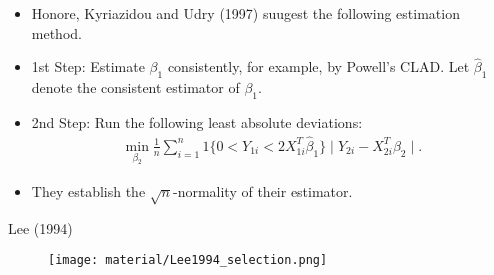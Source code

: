 \documentclass[xcolor=svgnames,dvipdfmx,cjk]{beamer}
\theoremstyle{example}
\begin{document}
\begin{frame}
      \begin{itemize}
            \item Honore, Kyriazidou and Udry (1997) suugest the following estimation method.
            \item \alert{1st Step}: Estimate $\beta_1$ consistently, 
                  for example, by Powell's CLAD.
                  Let $\hat{\beta}_1$ denote the consistent estimator of $\beta_1$.
            \item \alert{2nd Step}: Run the following least absolute deviations:
                  \begin{align*}
                        \min_{\beta_2} \frac{1}{n} \sum_{i=1}^n
                                       1\{
                                          0 < Y_{1i} < 2 X_{1i}^T \hat{\beta}_1
                                       \}
                                       \mid Y_{2i} - X_{2i}^T \beta_2 \mid.
                  \end{align*}
            \item They establish the $\sqrt{n}$-normality of their estimator.
      \end{itemize}
\end{frame}


\begin{frame}{Lee (1994)}
      \begin{figure}
            \texttt{[image: material/Lee1994\_selection.png]}
      \end{figure}
\end{frame}
\end{document}
